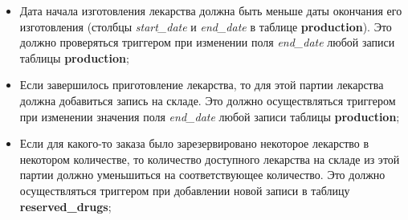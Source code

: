 \documentclass[a4paper]{article}
\newcommand{\dbtable}[1]{\textbf{#1}}
\newcommand{\dbtableref}[1]{\textit{#1}}
\begin{document}
\begin{itemize}
				\item Дата начала изготовления лекарства должна быть меньше даты окончания его изготовления (столбцы \dbtableref{start\_date} и \dbtableref{end\_date} в таблице \dbtable{production}). Это должно проверяться триггером при изменении поля \dbtableref{end\_date} любой записи таблицы \dbtable{production};
				
				\item Если завершилось приготовление лекарства, то для этой партии лекарства должна добавиться запись на складе. Это должно осуществляться  триггером при изменении значения поля \dbtableref{end\_date} любой записи таблицы \dbtable{production};
			
				\item Если для какого-то заказа было зарезервировано некоторое лекарство в некотором количестве, то количество доступного лекарства на складе из этой партии должно уменьшиться на соответствующее количество. Это должно осуществляться триггером при добавлении новой записи в таблицу \dbtable{reserved\_drugs};		
			\end{itemize}
	\newpage
\end{document}
